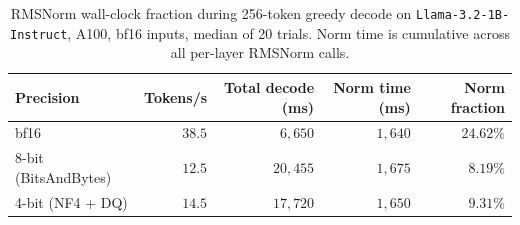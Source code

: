 \documentclass{article}
\begin{document}
\begin{table}[h!] \centering
\caption{RMSNorm wall-clock fraction during 256-token greedy decode on \texttt{Llama-3.2-1B-Instruct}, A100, bf16 inputs, median of 20 trials. Norm time is cumulative across all per-layer RMSNorm calls.}
\label{tab:rmsnorm-fraction}
\begin{tabular}{l r r r r}
\hline
Precision & Tokens/s & Total decode (ms) & Norm time (ms) & Norm fraction \\
\hline
bf16                  & $38.5$ & $6{,}650$  & $1{,}640$ & $\mathbf{24.62\%}$ \\
8-bit (BitsAndBytes)  & $12.5$ & $20{,}455$ & $1{,}675$ & $8.19\%$ \\
4-bit (NF4 + DQ)      & $14.5$ & $17{,}720$ & $1{,}650$ & $9.31\%$ \\
\hline
\end{tabular}
\end{table}
\end{document}

